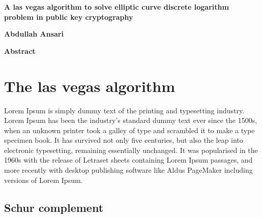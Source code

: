\thispagestyle{plain}
\begin{center}
    \Large
    \textbf{A las vegas algorithm to solve elliptic curve  discrete logarithm problem in public key cryptography}
        
    \vspace{0.4cm}
        
    \vspace{0.4cm}
    \textbf{Abdullah Ansari}
       
    \vspace{1cm}
    \textbf{Abstract}
\end{center}

\section*{The las vegas algorithm}
Lorem Ipsum is simply dummy text of the printing and typesetting industry. Lorem Ipsum has been the industry's standard dummy text ever since the 1500s, when an unknown printer took a galley of type and scrambled it to make a type specimen book. It has survived not only five centuries, but also the leap into electronic typesetting, remaining essentially unchanged. It was popularised in the 1960s with the release of Letraset sheets containing Lorem Ipsum passages, and more recently with desktop publishing software like Aldus PageMaker including versions of Lorem Ipsum.


\subsection*{Schur complement}
